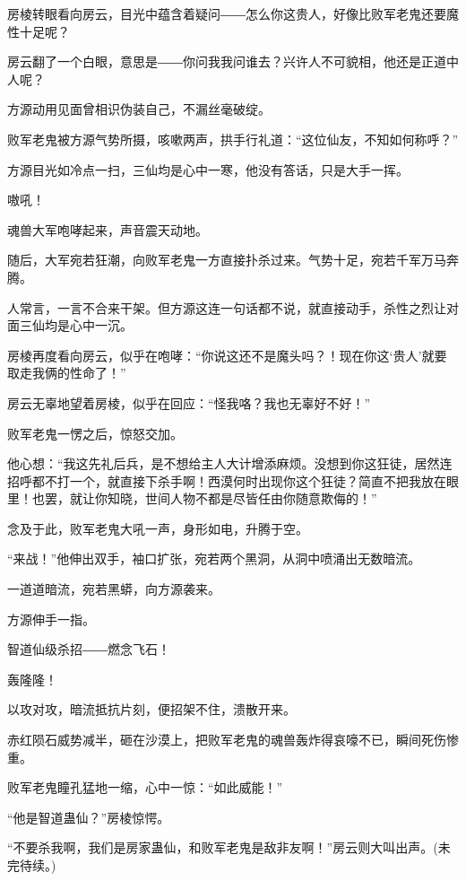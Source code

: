 \begin{this_body}
房棱转眼看向房云，目光中蕴含着疑问――怎么你这贵人，好像比败军老鬼还要魔性十足呢？

房云翻了一个白眼，意思是――你问我我问谁去？兴许人不可貌相，他还是正道中人呢？

方源动用见面曾相识伪装自己，不漏丝毫破绽。

败军老鬼被方源气势所摄，咳嗽两声，拱手行礼道：“这位仙友，不知如何称呼？”

方源目光如冷点一扫，三仙均是心中一寒，他没有答话，只是大手一挥。

嗷吼！

魂兽大军咆哮起来，声音震天动地。

随后，大军宛若狂潮，向败军老鬼一方直接扑杀过来。气势十足，宛若千军万马奔腾。

人常言，一言不合来干架。但方源这连一句话都不说，就直接动手，杀性之烈让对面三仙均是心中一沉。

房棱再度看向房云，似乎在咆哮：“你说这还不是魔头吗？！现在你这‘贵人’就要取走我俩的性命了！”

房云无辜地望着房棱，似乎在回应：“怪我咯？我也无辜好不好！”

败军老鬼一愣之后，惊怒交加。

他心想：“我这先礼后兵，是不想给主人大计增添麻烦。没想到你这狂徒，居然连招呼都不打一个，就直接下杀手啊！西漠何时出现你这个狂徒？简直不把我放在眼里！也罢，就让你知晓，世间人物不都是尽皆任由你随意欺侮的！”

念及于此，败军老鬼大吼一声，身形如电，升腾于空。

“来战！”他伸出双手，袖口扩张，宛若两个黑洞，从洞中喷涌出无数暗流。

一道道暗流，宛若黑蟒，向方源袭来。

方源伸手一指。

智道仙级杀招――燃念飞石！

轰隆隆！

以攻对攻，暗流抵抗片刻，便招架不住，溃散开来。

赤红陨石威势减半，砸在沙漠上，把败军老鬼的魂兽轰炸得哀嚎不已，瞬间死伤惨重。

败军老鬼瞳孔猛地一缩，心中一惊：“如此威能！”

“他是智道蛊仙？”房棱惊愕。

“不要杀我啊，我们是房家蛊仙，和败军老鬼是敌非友啊！”房云则大叫出声。(未完待续。)

\end{this_body}


